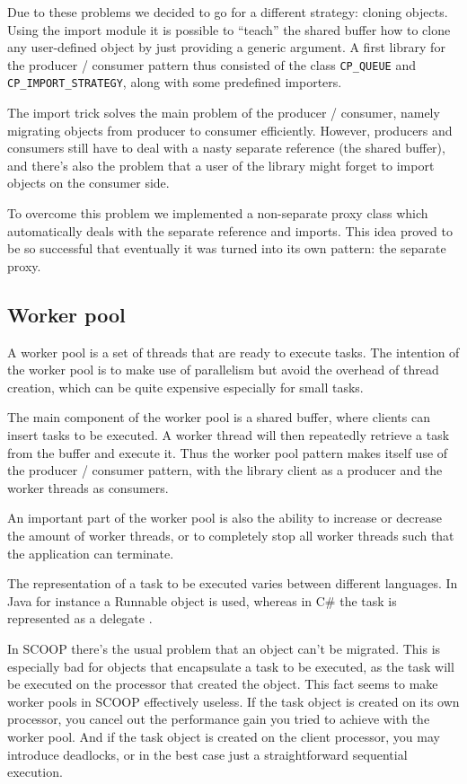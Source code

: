 \documentclass[a4paper,10pt]{report}
\begin{document}
Due to these problems we decided to go for a different strategy: cloning objects.
Using the import module it is possible to ``teach'' the shared buffer how to clone any user-defined object by just providing a generic argument.
A first library for the producer / consumer pattern thus consisted of the class \lstinline!CP_QUEUE! and \lstinline!CP_IMPORT_STRATEGY!, along with some predefined importers.

The import trick solves the main problem of the producer / consumer, namely migrating objects from producer to consumer efficiently.
However, producers and consumers still have to deal with a nasty separate reference (the shared buffer), and there's also the problem that a user of the library might forget to import objects on the consumer side.

To overcome this problem we implemented a non-separate proxy class which automatically deals with the separate reference and imports.
This idea proved to be so successful that eventually it was turned into its own pattern: the separate proxy.


\subsection{Worker pool}

A worker pool is a set of threads that are ready to execute tasks.
The intention of the worker pool is to make use of parallelism but avoid the overhead of thread creation, which can be quite expensive especially for small tasks.

The main component of the worker pool is a shared buffer, where clients can insert tasks to be executed.
A worker thread will then repeatedly retrieve a task from the buffer and execute it.
Thus the worker pool pattern makes itself use of the producer / consumer pattern, with the library client as a producer and the worker threads as consumers.

An important part of the worker pool is also the ability to increase or decrease the amount of worker threads, or to completely stop all worker threads such that the application can terminate.

The representation of a task to be executed varies between different languages.
In Java for instance a Runnable  object is used, whereas in C\# the task is represented as a delegate .

In SCOOP there's the usual problem that an object can't be migrated.
This is especially bad for objects that encapsulate a task to be executed, as the task will be executed on the processor that created the object.
This fact seems to make worker pools in SCOOP effectively useless.
If the task object is created on its own processor, you cancel out the performance gain you tried to achieve with the worker pool.
And if the task object is created on the client processor, you may introduce deadlocks, or in the best case just a straightforward sequential execution.
\end{document}
